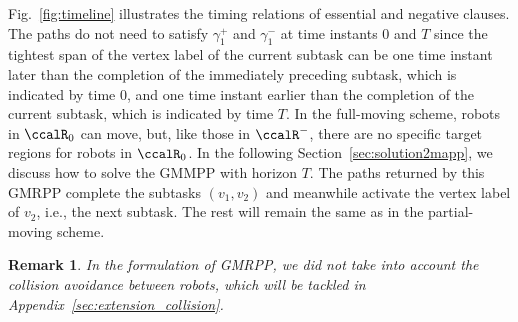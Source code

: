 \documentclass[Afour,sageh,times]{sagej}
\newtheorem{rem}[thm]{Remark}
\newcommand{\vertex}[1]{v_{\textup{#1}}}
\begin{document}
{Fig.~\ref{fig:timeline} illustrates the timing relations of essential and negative clauses.  The paths do not need to satisfy  $\gamma_1^+$ and $\gamma_1^-$ at time instants 0 and  $T$ since the tightest span of the vertex label of the current subtask can be one time instant later than the completion of the immediately preceding subtask, which is indicated by time 0, and one time instant earlier than the completion of the current subtask, which is indicated by time $T$. In the full-moving scheme, robots in $\ccalR_0$ can move, but, like those in $\ccalR^-$, there are no specific target regions for robots in $\ccalR_0$.  In the following Section~\ref{sec:solution2mapp}, we discuss how to solve the GMMPP with horizon $T$.  The paths returned by this GMRPP complete the subtasks $(v_1, v_2)$  and meanwhile activate the vertex label of $v_2$, i.e., the next subtask. %
 The rest will remain the same as in the partial-moving scheme.

 \begin{rem}
  In the formulation of GMRPP, we did not take into account the collision avoidance between robots, which will be tackled in Appendix~\ref{sec:extension_collision}.
\end{rem}




}
\end{document}
